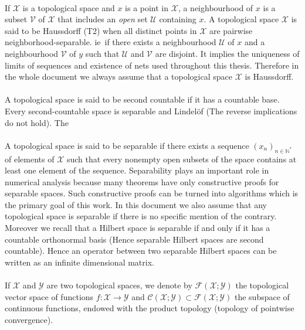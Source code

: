 \paragraph{}
If $\mathcal{X}$ is a topological space and $x$ is a point in $\mathcal{X}$, a
neighbourhood of $x$ is a subset $\mathcal{V}$ of $\mathcal{X}$ that includes
an \emph{open} set $\mathcal{U}$ containing $x$. A topological space
$\mathcal{X}$ is said to be Haussdorff (T2) when all distinct points in
$\mathcal{X}$ are pairwise neighborhood-separable. \acs{ie}~if there exists a
neighbourhood $\mathcal{U}$ of $x$ and a neighbourhood $\mathcal{V}$ of $y$
such that $\mathcal{U}$ and $\mathcal{V}$ are disjoint. It implies the
uniqueness of limits of sequences and existence of nets used throughout this
thesis. Therefore in the whole document we always assume that a topological
space $\mathcal{X}$ is Haussdorff.
\paragraph{}
A topological space is said to be second countable if it has a countable base.
Every second-countable space is separable and Lindel\"of (The reverse
implications do not hold). The
\paragraph{}
A topological space is said to be separable if there exists a sequence
$(x_n)_{n\in\mathbb{N}^*}$ of elements of $\mathcal{X}$ such that every
nonempty open subsets of the space contains at least one element of the
sequence. Separability plays an important role in numerical analysis because
many theorems have only constructive proofs for separable spaces. Such
constructive proofs can be turned into algorithms which is the primary goal of
this work. In this document we also assume that any topological space is
separable if there is no specific mention of the contrary. Moreover we recall
that a Hilbert space is separable if and only if it has a countable orthonormal
basis (Hence separable Hilbert spaces are second countable). Hence an operator
between two separable Hilbert spaces can be written as an infinite dimensional
matrix.
\paragraph{}
If $\mathcal{X}$ and $\mathcal{Y}$ are two topological spaces, we denote by
$\mathcal{F}(\mathcal{X};\mathcal{Y})$ the topological vector space of
functions $f:\mathcal{X}\to\mathcal{Y}$ and
$\mathcal{C}(\mathcal{X};\mathcal{Y}) \subset
\mathcal{F}(\mathcal{X};\mathcal{Y})$ the subspace of continuous functions,
endowed with the product topology (topology of pointwise convergence).

